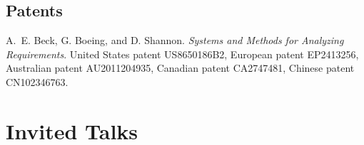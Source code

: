 \documentclass[11pt,a4paper]{report} %
\begin{document}
\subsection*{Patents}

\begin{tablist}

\item[2014] \tab{}A.~E. Beck, G. Boeing, and D. Shannon. \textit{Systems and Methods for Analyzing Requirements}. United States patent US8650186B2, European patent EP2413256, Australian patent AU2011204935, Canadian patent CA2747481, Chinese patent CN102346763.

\end{tablist}

\section*{Invited Talks}
\end{document}
